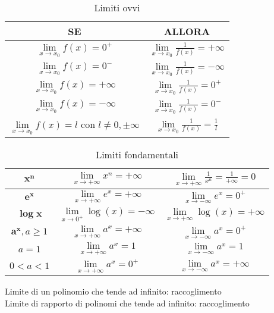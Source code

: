 \begin{table}[h!]
	\setlength{\tabcolsep}{7pt}
	\renewcommand{\arraystretch}{1.5}
	\centering
	\begin{tabular}{|c|c|}
		\hline
		\textbf{SE} & \textbf{ALLORA} \\
		\hline
		$\lim\limits_{x\to x_0}f(x) = 0^+$ & $\lim\limits_{x\to x_0}\frac{1}{f(x)} = +\infty$ \\
		\hline
		$\lim\limits_{x\to x_0}f(x) = 0^-$ & $\lim\limits_{x\to x_0}\frac{1}{f(x)} = -\infty$ \\
		\hline
		$\lim\limits_{x\to x_0}f(x) = +\infty$ & $\lim\limits_{x\to x_0}\frac{1}{f(x)} = 0^+$ \\
		\hline
		$\lim\limits_{x\to x_0}f(x) = -\infty$ & $\lim\limits_{x\to x_0}\frac{1}{f(x)} = 0^-$ \\
		\hline
		$\lim\limits_{x\to x_0}f(x) = l$ con $l \neq 0, \pm\infty$ & $\lim\limits_{x\to x_0}\frac{1}{f(x)} = \frac{1}{l}$ \\
		\hline
	\end{tabular}
	\caption{Limiti ovvi}
\end{table}

\begin{table}[h!]
	\setlength{\tabcolsep}{7pt}
	\renewcommand{\arraystretch}{1.5}
	\centering
	\begin{tabular}{|c|c c|}
		\hline
		$\mathbf{x^n}$ & $\lim\limits_{x\to +\infty}x^n = +\infty$ & $\lim\limits_{x\to +\infty}\frac{1}{x^n} = \frac{1}{+\infty} = 0$ \\
		\hline
		$\mathbf{e^x }$& $\lim\limits_{x\to +\infty}e^x = +\infty$ & $\lim\limits_{x\to -\infty}e^x = 0^+$ \\
		\hline
		$\mathbf{\log x}$ & $\lim\limits_{x\to 0^+}\log(x) = -\infty$ & $\lim\limits_{x\to +\infty}\log(x) = +\infty$ \\
		\hline
		$\mathbf{a^x}, a\geq 1$ &  $\lim\limits_{x\to +\infty}a^x = +\infty$ & $\lim\limits_{x\to -\infty}a^x = 0^+$ \\
		\hline
		$a = 1$ & $\lim\limits_{x\to +\infty}a^x = 1$ & $\lim\limits_{x\to -\infty}a^x = 1$  \\
		\hline
		$0 < a < 1$ & $\lim\limits_{x\to +\infty}a^x = 0^+$ & $\lim\limits_{x\to -\infty}a^x = +\infty$\\
		\hline
	\end{tabular}
	\vspace{-5pt}
	\caption{Limiti fondamentali}
\end{table}

Limite di un polinomio che tende ad infinito: raccoglimento\\
Limite di rapporto di polinomi che tende ad infinito: raccoglimento

